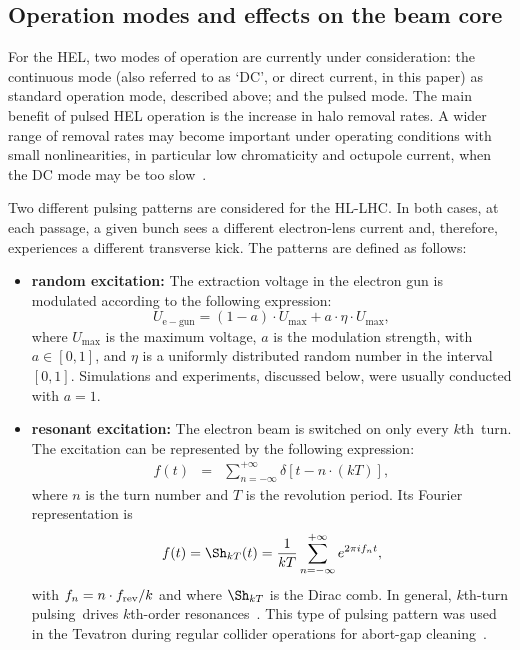 \documentclass[aps
,prstab
,reprint
,longbibliography
,preprintnumbers
,showkeys
,amsfonts,amssymb,amsmath
,floatfix
]{revtex4-1}
\newcommand{\kth}{$k$th}
\newcommand{\kthtp}{$k$th-turn pulsing}
\begin{document}
\subsection{Operation modes and effects on the beam core}
\label{sec:hel:core}

For the HEL, two modes of operation are currently under consideration:
the continuous mode (also referred to as `DC', or direct current, in
this paper) as standard operation mode, described above; and the
pulsed mode. The main benefit of pulsed HEL operation is the increase
in halo removal rates. A wider range of removal rates may become
important under operating conditions with small nonlinearities, in
particular low chromaticity and octupole current, when the DC mode may
be too slow~\cite{hel_halo_hllhc_fitterer, hl_halo_ipac2017}.

Two different pulsing patterns are considered for the HL-LHC. In both
cases, at each passage, a given bunch sees a different electron-lens
current and, therefore, experiences a different transverse kick. The
patterns are defined as follows:

\begin{itemize}

\item \textbf{random excitation:} The extraction voltage in the
  electron gun is modulated according to the
  following expression:
%
  \begin{equation}
    \label{eq:random}
    U_{\mathrm{e-gun}} = (1-a) \cdot U_{\mathrm{max}} +
    a \cdot \eta \cdot U_{\mathrm{max}},
  \end{equation}
%
  where $U_{\mathrm{max}}$ is the maximum voltage, $a$ is the
  modulation strength, with $a \in [0,1]$, and $\eta$ is a uniformly
  distributed random number in the interval~$[0,1]$. Simulations and
  experiments, discussed below, were usually conducted with $a = 1$.

\item \textbf{resonant excitation:} The electron beam is switched on
  only every \kth\ turn. The excitation can be represented
  by the following expression:
  \begin{eqnarray}
    \label{intro:eqn:1}
    f(t) & = & \sum_{n=-\infty}^{+\infty}\delta\left[t-n\cdot(kT)\right],
  \end{eqnarray}
  where $n$ is the turn number and $T$ is the revolution period. Its
  Fourier representation is
  \begin{equation}
    \label{intro:eqn:2}
    f(t) = \Sh_{kT}(t) = \frac{1}{kT}\sum_{n=-\infty}^{+\infty}e^{2\pi i f_nt},
  \end{equation}
  with $f_n = n \cdot f_{\rm rev} / k$ and where $\Sh_{kT}$ is the
  Dirac comb. In general, \kthtp\ drives \kth-order
  resonances~\cite{md_sim_hel_res_ex_fitterer}. This type of pulsing
  pattern was used in the Tevatron during regular collider operations
  for abort-gap cleaning~\cite{hel_tevatron_abortgap_zhang}.
\end{itemize}
\end{document}

